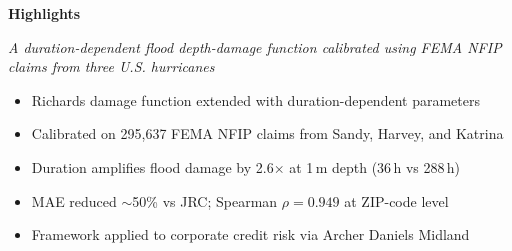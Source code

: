 \documentclass[12pt]{article}
\begin{document}
\begin{center}
\textbf{\Large Highlights}

\vspace{0.3em}
\textit{A duration-dependent flood depth-damage function calibrated using FEMA NFIP claims from three U.S. hurricanes}
\end{center}

\vspace{1em}

\begin{itemize}[leftmargin=*,itemsep=0.5em]
    \item Richards damage function extended with duration-dependent parameters
    \item Calibrated on 295{,}637 FEMA NFIP claims from Sandy, Harvey, and Katrina
    \item Duration amplifies flood damage by 2.6$\times$ at 1\,m depth (36\,h vs 288\,h)
    \item MAE reduced $\sim$50\% vs JRC; Spearman $\rho = 0.949$ at ZIP-code level
    \item Framework applied to corporate credit risk via Archer Daniels Midland
\end{itemize}
\end{document}
